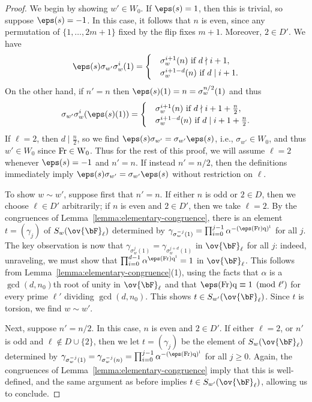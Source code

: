 \begin{proof}
    We begin by showing $w' \in W_0$. If $\eps(s) = 1$, then this is trivial, so suppose $\eps(s) = -1$. In this case, it follows that $n$ is even, since any permutation of $\{1, \dots, 2m+1\}$ fixed by the flip fixes $m+1$. Moreover, $2 \in D'$. We have
    \[
    \eps(s)\sigma_{w'}\sigma_w^i(1) =
    \begin{cases}
        &\sigma_w^{i+1}(n) \text{ if } d \nmid i+1, \\
        &\sigma_w^{i+1 - d}(n) \text{ if } d \mid i+1.
    \end{cases}
    \]
    On the other hand, if $n' = n$ then $\eps(s)(1) = n = \sigma_w^{n/2}(1)$ and thus
    \[
    \sigma_{w'}\sigma_w^i(\eps(s)(1)) =
    \begin{cases}
        &\sigma_w^{i + 1}(n) \text{ if } d \nmid i+1+\frac{n}{2}, \\
        &\sigma_w^{i + 1 - d}(n) \text{ if } d \mid i+1+\frac{n}{2}.
    \end{cases}
    \]
    If $\ell = 2$, then $d \mid \frac{n}{2}$, so we find $\eps(s)\sigma_{w'} = \sigma_{w'}\eps(s)$, i.e., $\sigma_{w'} \in W_0$, and thus $w' \in W_0$ since $\rm{Fr} \in W_0$. Thus for the rest of this proof, we will assume $\ell = 2$ whenever $\eps(s) = -1$ and $n' = n$. If instead $n' = n/2$, then the definitions immediately imply $\eps(s) \sigma_{w'} = \sigma_{w'} \eps(s)$ without restriction on $\ell$.\smallskip

    To show $w \sim w'$, suppose first that $n' = n$. If either $n$ is odd or $2 \in D$, then we choose $\ell \in D'$ arbitrarily; if $n$ is even and $2 \in D'$, then we take $\ell = 2$. By the congruences of Lemma~\ref{lemma:elementary-congruence}, there is an element $t = (\gamma_j)$ of $S_w(\ov{\bF}_\ell)$ determined by $\gamma_{\sigma_w^{-j}(1)} = \prod_{i=0}^{j-1} \alpha^{-(\eps(\rm{Fr})q)^i}$ for all $j$. The key observation is now that $\gamma_{\sigma_w^j(1)} = \gamma_{\sigma_w^{j + d}(1)}$ in $\ov{\bF}_\ell$ for all $j$: indeed, unraveling, we must show that $\prod_{i=0}^{d-1} \alpha^{\eps(\rm{Fr})q^i} = 1$ in $\ov{\bF}_\ell$. This follows from Lemma~\ref{lemma:elementary-congruence}(1), using the facts that $\alpha$ is a $\gcd(d, n_0)$th root of unity in $\ov{\bF}_\ell$ and that $\eps(\rm{Fr})q \equiv 1 \pmod{\ell'}$ for every prime $\ell'$ dividing $\gcd(d, n_0)$. This shows $t \in S_{w'}(\ov{\bF}_\ell)$. Since $t$ is torsion, we find $w \sim w'$. \smallskip

    Next, suppose $n' = n/2$. In this case, $n$ is even and $2 \in D'$. If either $\ell = 2$, or $n'$ is odd and $\ell \not\in D \cup \{2\}$, then we let $t = (\gamma_j)$ be the element of $S_w(\ov{\bF}_\ell)$ determined by $\gamma_{\sigma_w^{-j}(1)} = \gamma_{\sigma_w^{-j}(n)} = \prod_{i=0}^{j-1} \alpha^{-(\eps(\rm{Fr})q)^i}$ for all $j \geq 0$. Again, the congruences of Lemma~\ref{lemma:elementary-congruence} imply that this is well-defined, and the same argument as before implies $t \in S_{w'}(\ov{\bF}_\ell)$, allowing us to conclude.
\end{proof}

